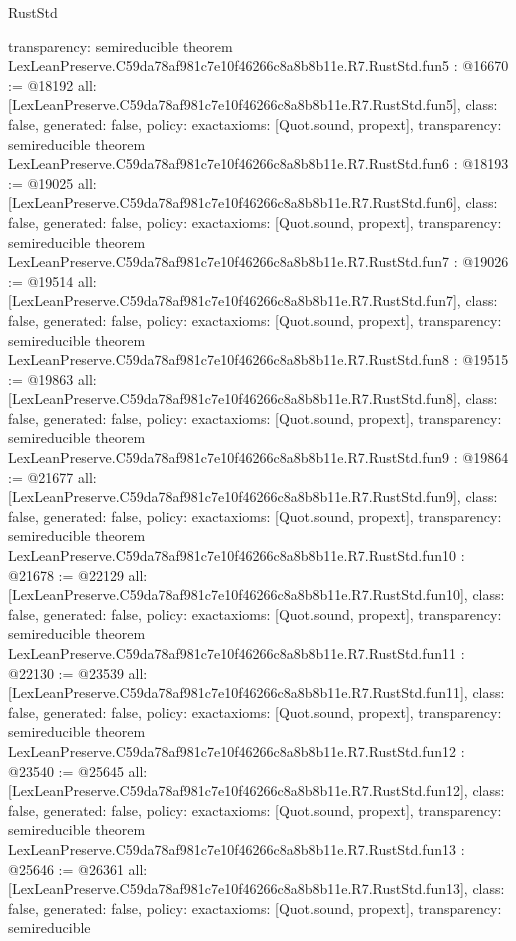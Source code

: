 \begin{lexlean}{RustStd}
\begin{coremodule}
{  transparency: semireducible
}
theorem LexLeanPreserve.C59da78af981c7e10f46266c8a8b8b11e.R7.RustStd.fun5 : @16670 := @18192 {
  all: [LexLeanPreserve.C59da78af981c7e10f46266c8a8b8b11e.R7.RustStd.fun5],
  class: false,
  generated: false,
  policy: exact{axioms: [Quot.sound, propext]},
  transparency: semireducible
}
theorem LexLeanPreserve.C59da78af981c7e10f46266c8a8b8b11e.R7.RustStd.fun6 : @18193 := @19025 {
  all: [LexLeanPreserve.C59da78af981c7e10f46266c8a8b8b11e.R7.RustStd.fun6],
  class: false,
  generated: false,
  policy: exact{axioms: [Quot.sound, propext]},
  transparency: semireducible
}
theorem LexLeanPreserve.C59da78af981c7e10f46266c8a8b8b11e.R7.RustStd.fun7 : @19026 := @19514 {
  all: [LexLeanPreserve.C59da78af981c7e10f46266c8a8b8b11e.R7.RustStd.fun7],
  class: false,
  generated: false,
  policy: exact{axioms: [Quot.sound, propext]},
  transparency: semireducible
}
theorem LexLeanPreserve.C59da78af981c7e10f46266c8a8b8b11e.R7.RustStd.fun8 : @19515 := @19863 {
  all: [LexLeanPreserve.C59da78af981c7e10f46266c8a8b8b11e.R7.RustStd.fun8],
  class: false,
  generated: false,
  policy: exact{axioms: [Quot.sound, propext]},
  transparency: semireducible
}
theorem LexLeanPreserve.C59da78af981c7e10f46266c8a8b8b11e.R7.RustStd.fun9 : @19864 := @21677 {
  all: [LexLeanPreserve.C59da78af981c7e10f46266c8a8b8b11e.R7.RustStd.fun9],
  class: false,
  generated: false,
  policy: exact{axioms: [Quot.sound, propext]},
  transparency: semireducible
}
theorem LexLeanPreserve.C59da78af981c7e10f46266c8a8b8b11e.R7.RustStd.fun10 : @21678 := @22129 {
  all: [LexLeanPreserve.C59da78af981c7e10f46266c8a8b8b11e.R7.RustStd.fun10],
  class: false,
  generated: false,
  policy: exact{axioms: [Quot.sound, propext]},
  transparency: semireducible
}
theorem LexLeanPreserve.C59da78af981c7e10f46266c8a8b8b11e.R7.RustStd.fun11 : @22130 := @23539 {
  all: [LexLeanPreserve.C59da78af981c7e10f46266c8a8b8b11e.R7.RustStd.fun11],
  class: false,
  generated: false,
  policy: exact{axioms: [Quot.sound, propext]},
  transparency: semireducible
}
theorem LexLeanPreserve.C59da78af981c7e10f46266c8a8b8b11e.R7.RustStd.fun12 : @23540 := @25645 {
  all: [LexLeanPreserve.C59da78af981c7e10f46266c8a8b8b11e.R7.RustStd.fun12],
  class: false,
  generated: false,
  policy: exact{axioms: [Quot.sound, propext]},
  transparency: semireducible
}
theorem LexLeanPreserve.C59da78af981c7e10f46266c8a8b8b11e.R7.RustStd.fun13 : @25646 := @26361 {
  all: [LexLeanPreserve.C59da78af981c7e10f46266c8a8b8b11e.R7.RustStd.fun13],
  class: false,
  generated: false,
  policy: exact{axioms: [Quot.sound, propext]},
  transparency: semireducible
}
\end{coremodule}
\end{lexlean}
